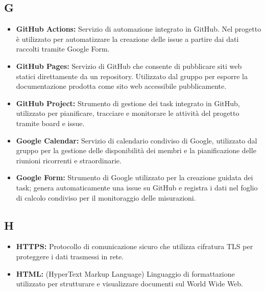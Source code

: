 \subsection*{G}
\begin{itemize}[leftmargin=*]
      \item \textbf{GitHub Actions:} Servizio di automazione integrato in GitHub. Nel progetto è utilizzato per automatizzare la creazione delle issue a partire dai dati raccolti tramite Google Form.
      \item \textbf{GitHub Pages:} Servizio di GitHub che consente di pubblicare siti
            web statici direttamente da un repository. Utilizzato dal gruppo per
            esporre la documentazione prodotta come sito web accessibile pubblicamente.
      \item \textbf{GitHub Project:} Strumento di gestione dei task integrato in
            GitHub, utilizzato per pianificare, tracciare e monitorare le attività
            del progetto tramite board e issue.
      \item \textbf{Google Calendar:} Servizio di calendario condiviso di Google,
            utilizzato dal gruppo per la gestione delle disponibilità dei membri e
            la pianificazione delle riunioni ricorrenti e straordinarie.
      \item \textbf{Google Form:} Strumento di Google utilizzato per la creazione
          guidata dei task; genera automaticamente una issue su GitHub e registra
          i dati nel foglio di calcolo condiviso per il monitoraggio delle
          misurazioni.
\end{itemize}
 
{}
\subsection*{H}
\begin{itemize}[leftmargin=*]
      \item \textbf{HTTPS:} Protocollo di comunicazione sicuro che utilizza cifratura TLS per proteggere i dati trasmessi in rete.
      \item \textbf{HTML:} (HyperText Markup Language) Linguaggio di formattazione utilizzato per strutturare e visualizzare documenti sul World Wide Web.
\end{itemize}
 
{}
